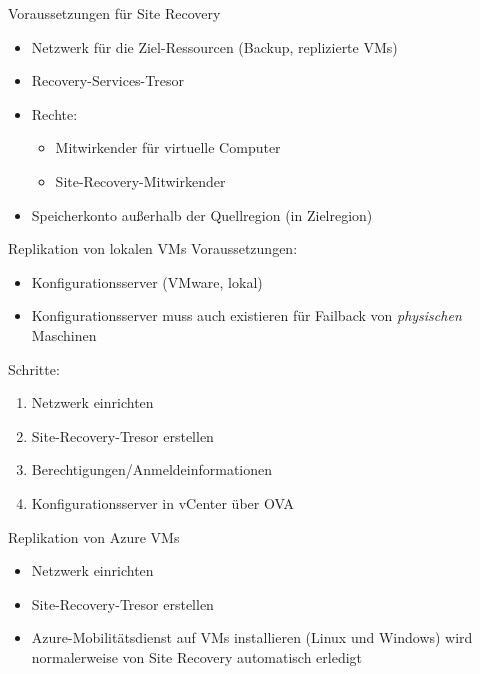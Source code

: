 \begin{flashcard}[Definition]{Voraussetzungen für Site Recovery}
    \begin{itemize}
        \item Netzwerk für die Ziel-Ressourcen (Backup, replizierte VMs)
        \item Recovery-Services-Tresor
        \item Rechte:
            \begin{itemize}
                \item Mitwirkender für virtuelle Computer
                \item Site-Recovery-Mitwirkender
            \end{itemize}
        \item Speicherkonto außerhalb der Quellregion (in Zielregion)
    \end{itemize}
\end{flashcard}

\begin{flashcard}[Definition]{Replikation von lokalen VMs}
    Voraussetzungen:
    \begin{itemize}
        \item Konfigurationsserver (VMware, lokal)
        \item Konfigurationsserver muss auch existieren für Failback von \emph{physischen} Maschinen
    \end{itemize}
    Schritte:
    \begin{enumerate}
        \item Netzwerk einrichten
        \item Site-Recovery-Tresor erstellen
        \item Berechtigungen/Anmeldeinformationen
        \item Konfigurationsserver in vCenter über OVA
    \end{enumerate}

\end{flashcard}

\begin{flashcard}[Definition]{Replikation von Azure VMs}
    \begin{itemize}
        \item Netzwerk einrichten
        \item Site-Recovery-Tresor erstellen
        \item Azure-Mobilitätsdienst auf VMs installieren (Linux und Windows)\newline
            wird normalerweise von Site Recovery automatisch erledigt
    \end{itemize}
\end{flashcard}


